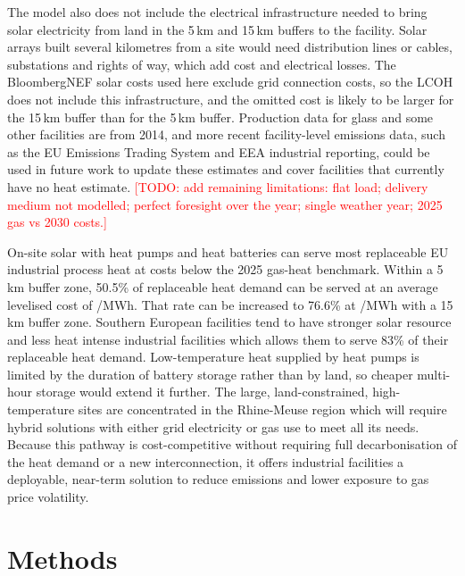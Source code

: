 \documentclass[11pt]{article}
\newcommand{\todo}[1]{\textcolor{red}{[TODO: #1]}}
\begin{document}
The model also does not include the electrical infrastructure needed to bring solar electricity from land in the 5\,km and 15\,km buffers to the facility. Solar arrays built several kilometres from a site would need distribution lines or cables, substations and rights of way, which add cost and electrical losses. The BloombergNEF solar costs used here exclude grid connection costs\cite{bnef2026lcoemethod}, so the LCOH does not include this infrastructure, and the omitted cost is likely to be larger for the 15\,km buffer than for the 5\,km buffer.
Production data for glass and some other facilities are from 2014, and more recent facility-level emissions data, such as the EU Emissions Trading System and EEA industrial reporting, could be used in future work to update these estimates and cover facilities that currently have no heat estimate.
\todo{add remaining limitations: flat load; delivery medium not modelled; perfect foresight over the year; single weather year; 2025 gas vs 2030 costs.}

On-site solar with heat pumps and heat batteries can serve most replaceable EU industrial process heat at costs below the 2025 gas-heat benchmark. Within a 5\,km buffer zone, 50.5\% of replaceable heat demand can be served at an average levelised cost of /MWh. That rate can be increased to 76.6\% at /MWh with a 15\,km buffer zone. Southern European facilities tend to have stronger solar resource and less heat intense industrial facilities which allows them to serve 83\% of their replaceable heat demand. Low-temperature heat supplied by heat pumps is limited by the duration of battery storage rather than by land, so cheaper multi-hour storage would extend it further. The large, land-constrained, high-temperature sites are concentrated in the Rhine-Meuse region which will require hybrid solutions with either grid electricity or gas use to meet all its needs. Because this pathway is cost-competitive without requiring full decarbonisation of the heat demand or a new interconnection, it offers industrial facilities a deployable, near-term solution to reduce emissions and lower exposure to gas price volatility.

\section*{Methods}
\end{document}
